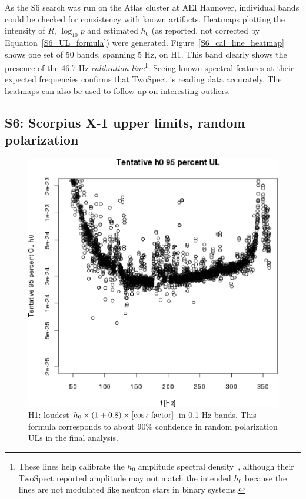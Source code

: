 As the S6 search was run on the Atlas cluster at AEI Hannover, individual bands could be checked for consistency with known artifacts.
Heatmaps plotting the intensity of $R$, $\log_{10}p$ and estimated $h_0$ (as reported, not corrected by Equation~\ref{S6_UL_formula}) were generated.
Figure~\ref{S6_cal_line_heatmap} shows one set of 50 bands, spanning 5 Hz, on H1.
This band clearly shows the presence of the 46.7 Hz \textit{calibration line}\footnote{These lines help calibrate the $h_0$ amplitude spectral density~\cite{MeadorsFeedforward2014}, although their TwoSpect reported amplitude may not match the intended $h_0$ because the lines are not modulated like neutron stars in binary systems.}.
Seeing known spectral features at their expected frequencies confirms that TwoSpect is reading data accurately. 
The heatmaps can also be used to follow-up on interesting outliers.

\subsection{S6: Scorpius X-1 upper limits, random polarization}

\begin{figure}
\begin{center}
\includegraphics[width=0.68\paperwidth,height=0.48\paperheight]{plots/h0FullUL95logGuess-H1.eps}
\caption{
H1: loudest $h_0 \times \left( 1 + 0.8 \right) \times \left[\cos \iota \textup{ factor}\right]$ in 0.1 Hz bands. This formula corresponds to about 90\% confidence in random polarization ULs in the final analysis.}
\label{S6_H1_UL}
\end{center}
\end{figure}

